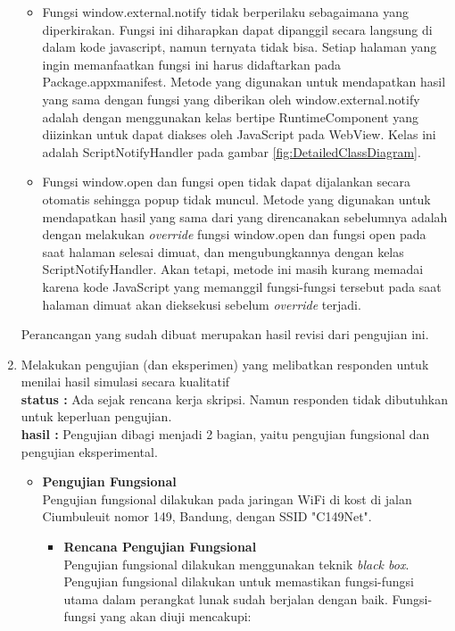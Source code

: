 \documentclass[a4paper,twoside]{article}
\begin{document}
\begin{enumerate}
            \begin{itemize}
                \item{Fungsi window.external.notify tidak berperilaku sebagaimana yang diperkirakan. Fungsi ini diharapkan dapat dipanggil secara langsung di dalam kode javascript, namun ternyata tidak bisa. Setiap halaman yang ingin memanfaatkan fungsi ini harus didaftarkan pada Package.appxmanifest. Metode yang digunakan untuk mendapatkan hasil yang sama dengan fungsi yang diberikan oleh window.external.notify adalah dengan menggunakan kelas bertipe RuntimeComponent yang diizinkan untuk dapat diakses oleh JavaScript pada WebView. Kelas ini adalah ScriptNotifyHandler pada gambar \ref{fig:DetailedClassDiagram}.}
                \item{Fungsi window.open dan fungsi open tidak dapat dijalankan secara otomatis sehingga popup tidak muncul. Metode yang digunakan untuk mendapatkan hasil yang sama dari yang direncanakan sebelumnya adalah dengan melakukan \textit{override} fungsi window.open dan fungsi open pada saat halaman selesai dimuat, dan mengubungkannya dengan kelas ScriptNotifyHandler. Akan tetapi, metode ini masih kurang memadai karena kode JavaScript yang memanggil fungsi-fungsi tersebut pada saat halaman dimuat akan dieksekusi sebelum \textit{override} terjadi.}
            \end{itemize}

            Perancangan yang sudah dibuat merupakan hasil revisi dari pengujian ini.

		\item Melakukan pengujian (dan eksperimen) yang melibatkan responden untuk menilai hasil simulasi secara kualitatif\\
		{\bf status :} Ada sejak rencana kerja skripsi. Namun responden tidak dibutuhkan untuk keperluan pengujian.\\
		{\bf hasil :} Pengujian dibagi menjadi 2 bagian, yaitu pengujian fungsional dan pengujian eksperimental.
        \begin{itemize}
            \item{
                {\bf Pengujian Fungsional}\\
                Pengujian fungsional dilakukan pada jaringan WiFi di kost di jalan Ciumbuleuit nomor 149, Bandung, dengan SSID "C149Net".
                \begin{itemize}
                    \item{
                        {\bf Rencana Pengujian Fungsional}\\
                        Pengujian fungsional dilakukan menggunakan teknik \textit{black box}. Pengujian fungsional dilakukan untuk memastikan fungsi-fungsi utama dalam perangkat lunak sudah berjalan dengan baik. Fungsi-fungsi yang akan diuji mencakupi:

}
\end{itemize}}
\end{itemize}
\end{enumerate}
\end{document}
